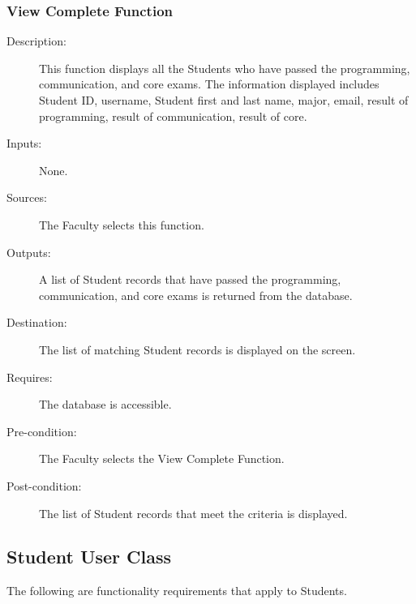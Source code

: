 \subsubsection{\large View Complete Function}  
\begin{boxed} %
\begin{description}
\item[Description:]
   This function displays all the Students who have passed the programming,
   communication, and core exams. The information displayed includes Student ID,
   username, Student first and last name, major, email, result of programming,
   result of communication, result of core.
\item[Inputs:]
   None.
\item[Sources:]
   The Faculty selects this function.
\item[Outputs:]
   A list of Student records that have passed the programming,
   communication, and core exams is returned from the database.
\item[Destination:]
   The list of matching Student records is displayed on the screen.
\item[Requires:]
   The database is accessible.
\item[Pre-condition:]
   The Faculty selects the View Complete Function.
\item[Post-condition:]
   The list of Student records that meet the criteria is displayed.
\end{description}
\end{boxed}

\subsection{Student User Class}
The following are functionality requirements that apply to Students.

